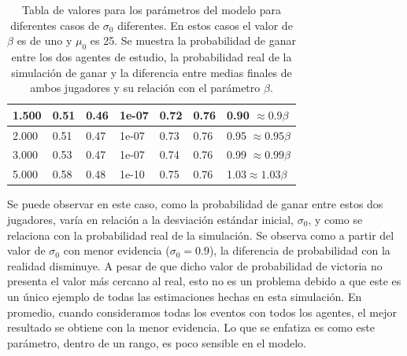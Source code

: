 \documentclass[11pt,twoside,spanish]{report} %
\begin{document}
\begin{table}[H]
{\begin{tabular}{|l|l|l|l|l|l|l|}
1.500                                   & 0.51                                   & 0.46                                     & 1e-07                                  & 0.72                                                 & 0.76                                            & 0.90 $ \approx 0.9\beta$                      \\ \hline
2.000                                   & 0.51                                    & 0.47                                    & 1e-07                                  & 0.73                                                 & 0.76                                            & 0.95 $ \approx 0.95\beta$                     \\ \hline
3.000                                   & 0.53                                    & 0.47                                     & 1e-07                                  & 0.74                                                 & 0.76                                            & 0.99 $ \approx 0.99\beta$                     \\ \hline
5.000                                   & 0.58                                   & 0.48                                     & 1e-10                                  & 0.75                                                 & 0.76                                            & 1.03$ \approx 1.03\beta$                      \\ \hline
\end{tabular}%
}
\caption{Tabla de valores para los par\'ametros del modelo para diferentes casos de $\sigma_0$ diferentes. En estos casos el valor de $\beta$ es de uno y $\mu_0$ es 25. Se muestra la probabilidad de ganar entre los dos agentes de estudio, la probabilidad real de la simulaci\'on de ganar y la diferencia entre medias finales de ambos jugadores y su relaci\'on con el par\'ametro $\beta$.}
\label{tab:sigma}
\end{table}

%


Se puede observar en este caso, como la probabilidad de ganar entre estos dos jugadores, var\'ia en relaci\'on a la desviaci\'on est\'andar inicial, $\sigma_0$, y como se relaciona con la probabilidad real de la simulaci\'on.
Se observa como a partir del valor de $\sigma_0$ con menor evidencia ($\sigma_0 = 0.9$), la diferencia de probabilidad con la realidad disminuye.
A pesar de que dicho valor de probabilidad de victoria no presenta el valor m\'as cercano al real, esto no es un problema debido a que este es un \'unico ejemplo de todas las estimaciones hechas en esta simulaci\'on.
En promedio, cuando consideramos todas los eventos con todos los agentes, el mejor resultado  se obtiene con la menor evidencia.
Lo que se enfatiza es como este par\'ametro, dentro de un rango, es poco sensible en el modelo.
\end{document}
